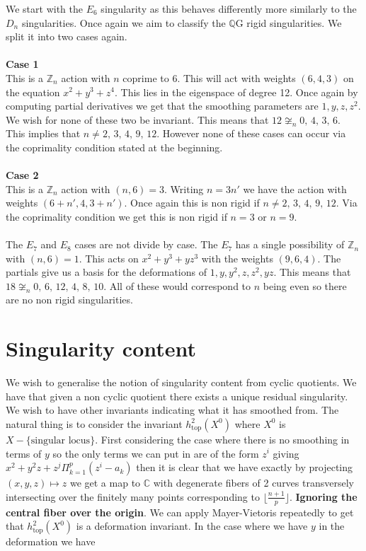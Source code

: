 \documentclass[11pt]{report}
\theoremstyle{definition}
\theoremstyle{definition}
\theoremstyle{definition}
\theoremstyle{definition}
\theoremstyle{definition}
\theoremstyle{definition}
\theoremstyle{definition}
\theoremstyle{definition}
\begin{document}
 We start with the $E_6$ singularity as this behaves differently more similarly to the $D_n$ singularities. Once again we aim to classify the $\mathbb{Q}$G rigid singularities. We split it into two cases again. 
 \\
 \\
 \textbf{Case 1}
 \\
 This is a $\mathbb{Z}_n$ action with $n$ coprime to 6. This will act with weights $(6,4,3)$ on the equation $x^2 + y^3 + z^4$. This lies in the eigenspace of degree 12. Once again by computing partial derivatives we get that the smoothing parameters are $1, y, z, z^2$. We wish for none of these two be invariant. This means that $12 \not\cong_n 0, \, 4, \, 3, \, 6$. This implies that $n \neq  2, \, 3, \, 4, \, 9, \, 12$. However none of these cases can occur via the coprimality condition stated at the beginning.
 \\
 \\
 \textbf{Case 2}
 \\
 This is a $\mathbb{Z}_n$ action with $(n, 6) = 3$. Writing $n = 3n'$ we have the action with weights $(6 + n', 4, 3 + n')$. Once again this is non rigid if $n \neq  2, \, 3, \, 4, \, 9, \, 12$. Via the coprimality condition we get this is non rigid if $n=3$ or $n=9$.
 \\
 \\
 The $E_7$ and $E_8$ cases are not divide by case. The $E_7$ has a single possibility of $\mathbb{Z}_n$ with $(n,6) = 1$. This acts on $x^2 + y^3 + yz^3$ with the weights $(9,6,4)$. The partials give us a basis for the deformations of $1, y, y^2, z, z^2, yz$. This means that $18 \not\cong_n 0, \, 6, \, 12, \, 4, \, 8, \, 10$. All of these would correspond to $n$ being even so there are no non rigid singularities. 
 
 
 \section{Singularity content}
 
 We wish to generalise the notion of singularity content from cyclic quotients. We have that given a non cyclic quotient there exists a unique residual singularity. We wish to have other invariants indicating what it has smoothed from. The natural thing is to consider the invariant $h^2_{\text{top}}(X^0)$ where $X^0$ is $X-\{\text{singular locus}\}$. First considering the case where there is no smoothing in terms of $y$ so the only terms we can put in are of the form $z^i$ giving $x^2 + y^2z +z^j \Pi_{k=1}^{p} (z^i - a_k)$ then it is clear that we have exactly by projecting $(x,y,z) \mapsto z$ we get a map to $\mathbb{C}$ with degenerate fibers of 2 curves transversely intersecting over the finitely many points corresponding to $\lfloor \frac{n+1}{p} \rfloor$. 
 \textbf{Ignoring the central fiber over the origin}. We can apply Mayer-Vietoris repeatedly to get that $h^2_{\text{top}}(X^0)$ is a deformation invariant. In the case where we have $y$ in the deformation we have 
 
\end{document}
